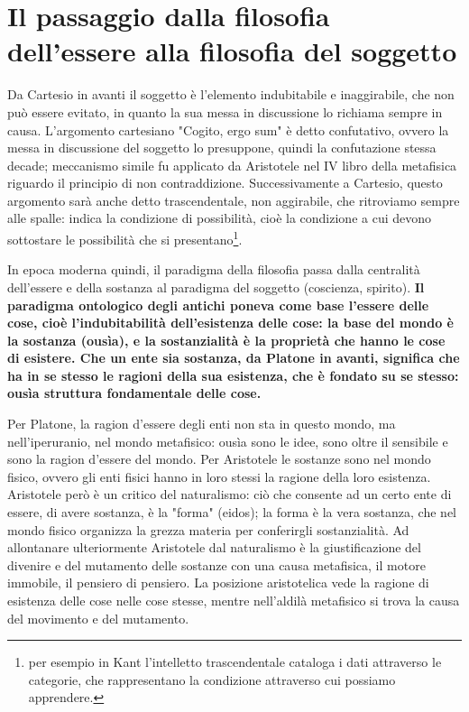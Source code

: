 \chapter{Il passaggio dalla filosofia dell'essere alla filosofia del soggetto}

\bigskip
\bigskip
\bigskip
\bigskip
\bigskip


Da Cartesio in avanti il soggetto è l'elemento indubitabile e inaggirabile, che non può essere evitato, in quanto la sua messa in discussione lo richiama sempre in causa. L'argomento cartesiano "Cogito, ergo sum" è detto confutativo, ovvero la messa in discussione del soggetto lo presuppone, quindi la confutazione stessa decade; meccanismo simile fu applicato da Aristotele nel IV libro della metafisica riguardo il principio di non contraddizione. Successivamente a Cartesio, questo argomento sarà anche detto  trascendentale,  non aggirabile, che ritroviamo sempre alle spalle: indica la condizione di possibilità, cioè la condizione a cui devono sottostare le possibilità che si presentano\footnote{per esempio in Kant l’intelletto trascendentale
	cataloga i dati attraverso le categorie, che rappresentano la condizione attraverso cui possiamo apprendere.}.

In epoca moderna quindi, il paradigma della filosofia passa dalla centralità dell'essere e della sostanza al paradigma del soggetto (coscienza, spirito). \textbf{Il paradigma ontologico degli antichi poneva come base l'essere delle cose, cioè l'indubitabilità dell'esistenza delle cose: la base del mondo è la sostanza (ousìa), e la sostanzialità è la proprietà che hanno le cose di esistere. Che un ente sia sostanza, da Platone in avanti, significa che ha in se stesso le ragioni della sua esistenza, che è fondato su se stesso: ousìa struttura fondamentale delle cose.}

Per Platone, la ragion d'essere degli enti non sta in questo mondo, ma nell'iperuranio, nel mondo metafisico: ousìa sono le idee, sono oltre il sensibile e sono la ragion d'essere del mondo. Per Aristotele le sostanze sono nel mondo fisico, ovvero gli enti fisici hanno in loro stessi la ragione della loro esistenza. Aristotele però è un critico del naturalismo: ciò che consente ad un certo ente di essere, di avere sostanza, è la "forma" (eidos); la forma è la vera sostanza, che nel mondo fisico organizza la grezza materia per conferirgli sostanzialità. Ad allontanare ulteriormente Aristotele dal naturalismo è la giustificazione del divenire e del mutamento delle sostanze con una causa metafisica, il motore immobile, il pensiero di pensiero. La posizione aristotelica vede la ragione di esistenza delle cose nelle cose stesse, mentre nell'aldilà metafisico si trova la causa del movimento e del mutamento.

